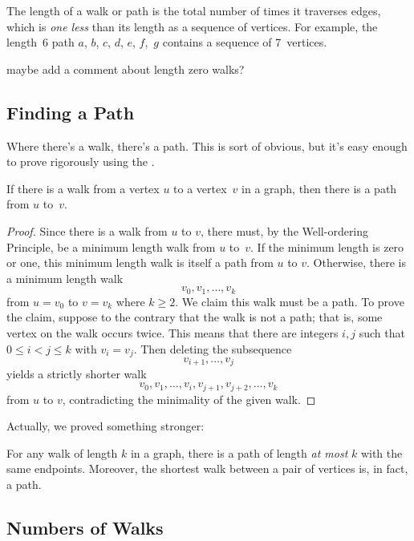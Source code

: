 The length of a walk or path is the total number of times it traverses
edges, which is \emph{one less} than its length as a sequence of
vertices.  For example, the length~6 path $a$, $b$, $c$, $d$, $e$,
$f$,~$g$ contains a sequence of 7~vertices.

\begin{editingnotes}
maybe add a comment about length zero walks?
\end{editingnotes}

\subsection{Finding a Path}

Where there's a walk, there's a path.  This is sort of obvious, but
it's easy enough to prove rigorously using the .

\begin{lemma}\label{simplepath}
If there is a walk from a vertex $u$ to a vertex~$v$ in a graph, then
there is a path from $u$ to~$v$.
\end{lemma}

\begin{proof}
Since there is a walk from $u$ to $v$, there must, by the
Well-ordering Principle, be a minimum length walk from $u$ to~$v$.  If
the minimum length is zero or one, this minimum length walk is itself
a path from $u$ to $v$.  Otherwise, there is a minimum length walk
\[
v_0, v_1, \dots, v_k
\]
from $u = v_0$ to $v = v_k$ where $k \geq 2$.  We claim this walk must
be a path.  To prove the claim, suppose to the contrary that the walk
is not a path; that is, some vertex on the walk occurs twice.  This
means that there are integers $i,j$ such that $0 \leq i < j \leq k$
with $v_i= v_j$.  Then deleting the subsequence
\[
    v_{i+1}, \dots, v_j
\]
yields a strictly shorter walk
\[
    v_0, v_1,\dots, v_i,v_{j+1},v_{j+2},\dots, v_k
\]
from $u$ to $v$, contradicting the minimality of the given walk.
\end{proof}

Actually, we proved something stronger:
\begin{corollary}\label{ss}
For any walk of length $k$ in a graph, there is a path of length
\emph{at most} $k$ with the same endpoints.  Moreover, the shortest
walk between a pair of vertices is, in fact, a path.
\end{corollary}

\subsection{Numbers of Walks}\label{num_walk_subsec}

